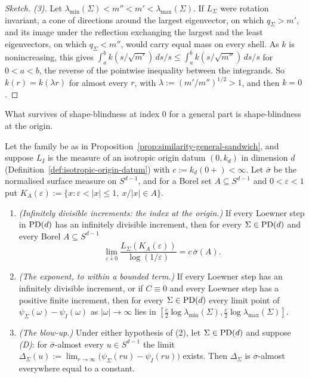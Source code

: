 \begin{proof}[Sketch]
\emph{(3).} Let $\lambda_{\min}(\Sigma) < m'' < m' < \lambda_{\max}(\Sigma)$. If $L_\Sigma$ were rotation
invariant, a cone of directions around the largest eigenvector, on which $q_\Sigma > m'$, and its
image under the reflection exchanging the largest and the least eigenvectors, on which
$q_\Sigma < m''$, would carry equal mass on every shell. As $k$ is nonincreasing,
this gives $\int_a^b k(s/\sqrt{m'})\,ds/s \le \int_a^b k(s/\sqrt{m''})\,ds/s$ for $0 < a < b$, the reverse of
the pointwise inequality between the integrands. So $k(r) = k(\lambda r)$ for almost every $r$, with
$\lambda := (m'/m'')^{1/2} > 1$, and then $k = 0$.
\end{proof}

What survives of shape-blindness at index $0$ for a general part is shape-blindness at the origin.

\begin{proposition}\label{prop:similarity-general-index-zero}
Let the family be as in Proposition~\ref{prop:similarity-general-sandwich}, and suppose $L_I$ is the \Levy{} measure of
an isotropic origin datum $(0, k_d)$ in dimension $d$ (Definition~\ref{def:isotropic-origin-datum}) with
$c := k_d(0{+}) < \infty$. Let $\overline\sigma$ be the normalised surface measure on $S^{d-1}$, and for a Borel
set $A \subseteq S^{d-1}$ and $0 < \varepsilon < 1$ put $K_A(\varepsilon) := \{x : \varepsilon < |x| \le 1,\ x/|x| \in A\}$.
\begin{enumerate}
\item \emph{(Infinitely divisible increments: the index at the origin.)} If every Loewner step in $\mathrm{PD}(d)$ has
an infinitely divisible increment, then for every $\Sigma \in \mathrm{PD}(d)$ and every Borel $A \subseteq S^{d-1}$
\[
  \lim_{\varepsilon\downarrow0}\frac{L_\Sigma(K_A(\varepsilon))}{\log(1/\varepsilon)} = c\,\overline\sigma(A) .
\]
\item \emph{(The exponent, to within a bounded term.)} If every Loewner step has an infinitely divisible
increment, or if $C \equiv 0$ and every Loewner step has a positive finite increment, then for every
$\Sigma \in \mathrm{PD}(d)$ every limit point of $\psi_\Sigma(\omega) - \psi_I(\omega)$ as $|\omega| \to \infty$ lies in
$[\tfrac c2\log\lambda_{\min}(\Sigma), \tfrac c2\log\lambda_{\max}(\Sigma)]$.
\item \emph{(The blow-up.)} Under either hypothesis of (2), let $\Sigma \in \mathrm{PD}(d)$ and suppose
\emph{(D)}: for $\overline\sigma$-almost every $u \in S^{d-1}$ the limit
$\Delta_\Sigma(u) := \lim_{r\to\infty}\bigl(\psi_\Sigma(ru) - \psi_I(ru)\bigr)$ exists. Then $\Delta_\Sigma$ is
$\overline\sigma$-almost everywhere equal to a constant.
\end{enumerate}
\end{proposition}

